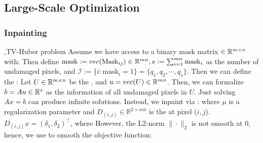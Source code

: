 \documentclass[10pt]{report}
\begin{document}
\subsection{Large-Scale Optimization}

\subsubsection{Inpainting}
\sep{TV-Huber problem}
Assume we have access to a binary mask matrix $\in \RR^{m\times n}$ with:
Then define $\text{mask}:=vec(\text{Mask}_{ij})\in\RR^{mn}, s:=\sum_{i=1}^{mn}\text{mask}_i$ as the number of undamaged pixels,
and $\mathcal{I}:=\{i:\mathrm{mask}_i=1\}=\{q_1,q_2,\cdots,q_s\}$. Then we can define the :
Let $U\in \RR^{m\times n}$ be the , and $u=vec(U)\in\RR^{mn}$. Then, we can formalize $b=Au\in\RR^s$ as
the information of all undamaged pixels in $U$. Just solving $Ax=b$ can produce infinite solutions. Instead, we inpaint via :
where $\mu$ is a regularization parameter and $D_{(i,j)}\in\mathbb{R}^{2\times mn}$ is the  at pixel ($i,j$).
$D_{(i,j)}x=(\delta_1,\delta_2)^\top $, where
However, the L2-norm $\|\cdot\|_2$ is not smooth at $0$, hence, we use  to smooth the objective function:
\end{document}
